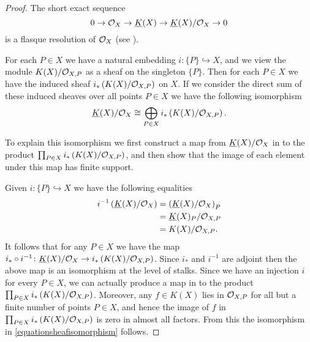     \begin{proof}
    The short exact sequence
        \begin{equation}\label{equationinitialdualitysesfunctions}
        0 \rightarrow {\cal O}_X \rightarrow \underline{K}(X) \rightarrow \underline{K}(X)/{\cal O}_X \rightarrow 0
        \end{equation}
    is a flasque resolution of ${\cal O}_X$ (see \cite[Chap.\ II, ex.\ 1.16]{hart}).
    
    For each $P \in X$ we have a natural embedding $i\colon \{P\} \hookrightarrow X$, and we view the module $K(X)/{\cal O}_{X,P}$ as a sheaf on the singleton $\{P\}$.
    Then for each $P\in X$ we have the induced sheaf $i_*\left( K(X)/{\cal O}_{X,P} \right)$ on $X$.
    If we consider the direct sum of these induced sheaves over all points $P\in X$ we have the following isomorphism
        \begin{equation}\label{equationsheafisomorphism}
        \underline{K}(X)/{\cal O}_X\cong \bigoplus_{P\in X} i_*\left(K(X)/{\cal O}_{X,P}\right).
        \end{equation}
    
    
    To explain this isomorphism we first construct a map from $\underline{K}(X)/{\cal O}_X$ in to the product $\prod_{P \in X} i_*\left({K(X)}/{\cal O}_{X,P}\right)$, and then show that the image of each element under this map has finite support.
    
    Given $i\colon \{P\} \hookrightarrow X$ we have the following equalities
        \begin{align*}
        i^{-1}\left(\underline{K}(X)/{\cal O}_X\right) & = \left(\underline{K}(X)/{\cal O}_X\right)_P \\
        & = \underline{K}(X)_P/{\cal O}_{X,P} \\
        & = K(X)/{\cal O}_{X,P}.
        \end{align*}
    It follows that for any $P \in X$ we have the map $i_* \circ i^{-1} \colon \underline{K}(X)/{\cal O}_X \rightarrow i_* \left( K(X)/{\cal O}_{X,P} \right)$.
    Since $i_*$ and $i^{-1}$ are adjoint \cite[Chap.\ II, \S 5]{hart} then the above map is an isomorphism at the level of stalks.
    Since we have an injection $i$ for every $P \in X$, we can actually produce a map in to the product $\prod_{P \in X} i_*\left(K(X)/{\cal O}_{X,P}\right)$.
    Moreover, any $f \in K(X)$ lies in ${\cal O}_{X,P}$ for all but a finite number of points $P \in X$, and hence the image of $f$ in $\prod_{P \in X} i_*\left(K(X)/{\cal O}_{X,P}\right)$ is zero in almost all factors.
    From this the isomorphism in \eqref{equationsheafisomorphism} follows.
    

\end{proof}
